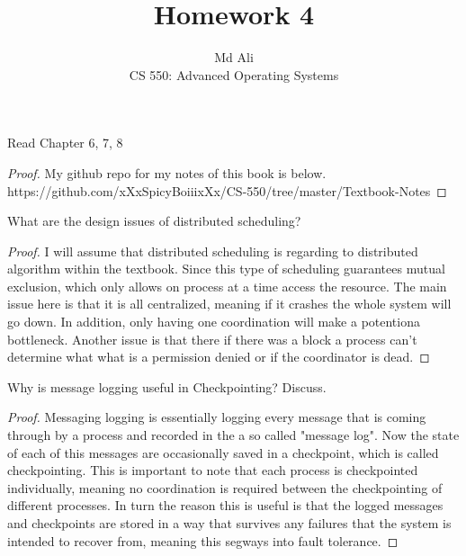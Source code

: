 \documentclass[12pt]{article}
\newenvironment{exercise}[2][Exercise]{\begin{trivlist}
\item[\hskip \labelsep {\bfseries #1}\hskip \labelsep {\bfseries #2.}]}{\end{trivlist}}
\begin{document}
 
\title{Homework 4}
\author{Md Ali\\ 
CS 550: Advanced Operating Systems}
\maketitle

 
\begin{exercise}{1}
Read Chapter 6, 7, 8
\end{exercise} 

\begin{proof}
My github repo for my notes of this book is below.
\\ 
https://github.com/xXxSpicyBoiiixXx/CS-550/tree/master/Textbook-Notes
\end{proof}
 
\begin{exercise}{2}
What are the design issues of distributed scheduling?
\end{exercise}
 
\begin{proof}
I will assume that distributed scheduling is regarding to distributed algorithm within the textbook. Since this type of scheduling guarantees mutual exclusion, which only allows on process at a time access the resource. The main issue here is that it is all centralized, meaning if it crashes the whole system will go down. In addition, only having one coordination will make a potentiona bottleneck. Another issue is that there if there was a block a process can't determine what what is a permission denied or if the coordinator is dead. 
\end{proof}

\begin{exercise}{3}
Why is message logging useful in Checkpointing? Discuss.
\end{exercise}

\begin{proof}
Messaging logging is essentially logging every message that is coming through by a process and recorded in the a so called "message log". Now the state of each of this messages are occasionally saved in a checkpoint, which is called checkpointing. This is important to note that each process is checkpointed individually, meaning no coordination is required between the checkpointing of different processes. In turn the reason this is useful is that the logged messages and checkpoints are stored in a way that survives any failures that the system is intended to recover from, meaning this segways into fault tolerance. 
\end{proof}
 
\end{document}

